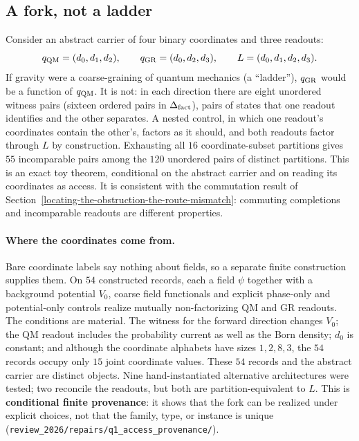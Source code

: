 \subsection{A fork, not a ladder}\label{the-resolution-a-fork-not-a-ladder}

Consider an abstract carrier of four binary coordinates and three readouts:
\[
q_{\rm QM}=(d_0,d_1,d_2),\qquad q_{\rm GR}=(d_0,d_2,d_3),\qquad L=(d_0,d_1,d_2,d_3).
\]
If gravity were a coarse-graining of quantum mechanics (a ``ladder''), \(q_{\rm GR}\) would be a function of
\(q_{\rm QM}\). It is not: in each direction there are eight unordered witness pairs (sixteen ordered pairs in
\(\Delta_{\mathrm{fact}}\)), pairs of states that one readout identifies and the other separates. A nested control, in which one readout's coordinates contain the other's,
factors as it should, and both readouts factor through \(L\) by construction. Exhausting all \(16\) coordinate-subset
partitions gives \(55\) incomparable pairs among the \(120\) unordered pairs of distinct partitions. This is an exact
toy theorem, conditional on the abstract carrier and on reading its coordinates as access. It is consistent with the
commutation result of Section~\ref{locating-the-obstruction-the-route-mismatch}: commuting completions and
incomparable readouts are different properties.

\paragraph{Where the coordinates come from.} Bare coordinate labels say nothing about fields, so a separate finite
construction supplies them. On \(54\) constructed records, each a field \(\psi\) together with a background potential
\(V_0\), coarse field functionals and explicit phase-only and potential-only controls realize mutually non-factorizing
QM and GR readouts. The conditions are material. The witness for the forward direction changes \(V_0\); the QM readout
includes the probability current as well as the Born density; \(d_0\) is constant; and although the coordinate alphabets
have sizes \(1,2,8,3\), the \(54\) records occupy only \(15\) joint coordinate values. These \(54\) records and the abstract carrier are
distinct objects. Nine hand-instantiated alternative architectures were tested; two reconcile the readouts, but both
are partition-equivalent to \(L\). This is \textbf{conditional finite provenance}: it shows that the fork can be
realized under explicit choices, not that the family, type, or instance is unique
(\nolinkurl{review_2026/repairs/q1_access_provenance/}).

